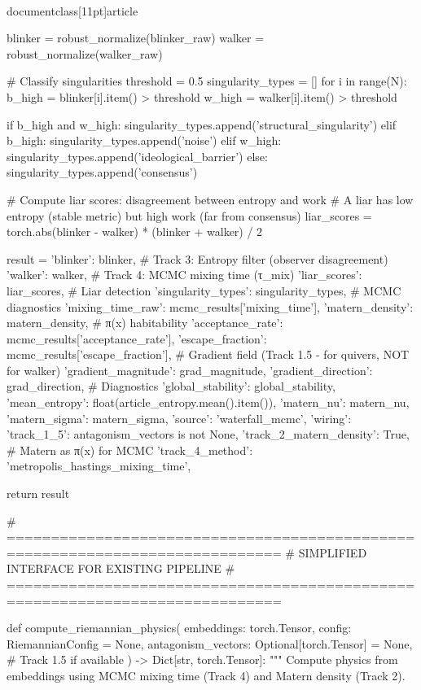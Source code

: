 \\documentclass[11pt]{article}
\begin{document}
\begin{CodeBlock}
    blinker = robust_normalize(blinker_raw)
    walker = robust_normalize(walker_raw)

    # Classify singularities
    threshold = 0.5
    singularity_types = []
    for i in range(N):
        b_high = blinker[i].item() > threshold
        w_high = walker[i].item() > threshold

        if b_high and w_high:
            singularity_types.append('structural_singularity')
        elif b_high:
            singularity_types.append('noise')
        elif w_high:
            singularity_types.append('ideological_barrier')
        else:
            singularity_types.append('consensus')

    # Compute liar scores: disagreement between entropy and work
    # A liar has low entropy (stable metric) but high work (far from consensus)
    liar_scores = torch.abs(blinker - walker) * (blinker + walker) / 2

    result = {
        'blinker': blinker,           # Track 3: Entropy filter (observer disagreement)
        'walker': walker,             # Track 4: MCMC mixing time (τ_mix)
        'liar_scores': liar_scores,   # Liar detection
        'singularity_types': singularity_types,
        # MCMC diagnostics
        'mixing_time_raw': mcmc_results['mixing_time'],
        'matern_density': matern_density,          # π(x) habitability
        'acceptance_rate': mcmc_results['acceptance_rate'],
        'escape_fraction': mcmc_results['escape_fraction'],
        # Gradient field (Track 1.5 - for quivers, NOT for walker)
        'gradient_magnitude': grad_magnitude,
        'gradient_direction': grad_direction,
        # Diagnostics
        'global_stability': global_stability,
        'mean_entropy': float(article_entropy.mean().item()),
        'matern_nu': matern_nu,
        'matern_sigma': matern_sigma,
        'source': 'waterfall_mcmc',
        'wiring': {
            'track_1_5': antagonism_vectors is not None,
            'track_2_matern_density': True,  # Matern as π(x) for MCMC
            'track_4_method': 'metropolis_hastings_mixing_time',
        }
    }

    return result


# =============================================================================
# SIMPLIFIED INTERFACE FOR EXISTING PIPELINE
# =============================================================================

def compute_riemannian_physics(
    embeddings: torch.Tensor,
    config: RiemannianConfig = None,
    antagonism_vectors: Optional[torch.Tensor] = None,  # Track 1.5 if available
) -> Dict[str, torch.Tensor]:
    """
    Compute physics from embeddings using MCMC mixing time (Track 4)
    and Matern density (Track 2).


\end{CodeBlock}
\end{document}
